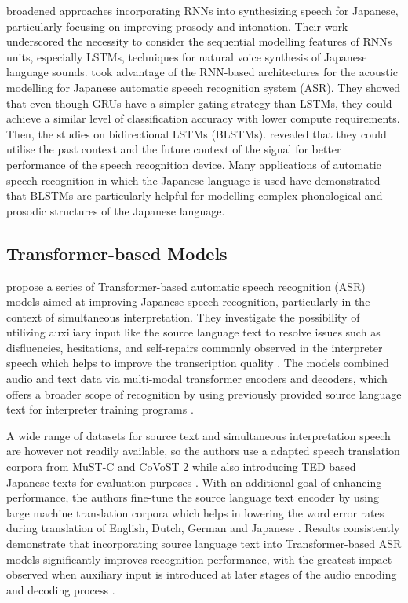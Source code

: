 \textcite{Kubo2014DeepLearning} broadened approaches incorporating RNNs into synthesizing speech for Japanese, particularly focusing on improving prosody and intonation. Their work underscored the necessity to consider the sequential modelling features of RNNs units, especially LSTMs, techniques for natural voice synthesis of Japanese language sounds. \textcite{takeuchi2020real} took advantage of the RNN-based architectures for the acoustic modelling for Japanese automatic speech recognition system (ASR). They showed that even though GRUs have a simpler gating strategy than LSTMs, they could achieve a similar level of classification accuracy with lower compute requirements. Then, the studies on bidirectional LSTMs (BLSTMs). \textcite{imaizumi2022} revealed that they could utilise the past context and the future context of the signal for better performance of the speech recognition device. Many applications of automatic speech recognition in which the Japanese language is used have demonstrated that BLSTMs are particularly helpful for modelling complex phonological and prosodic structures of the Japanese language.


\subsection{Transformer-based Models}  
\textcite{taniguchi2022transformer} propose a series of Transformer-based automatic speech recognition (ASR) models aimed at improving Japanese speech recognition, particularly in the context of simultaneous interpretation. They investigate the possibility of utilizing auxiliary input like the source language text to resolve issues such as disfluencies, hesitations, and self-repairs commonly observed in the interpreter speech which helps to improve the transcription quality \parencite{Futami2020Bidirectional}. The models combined audio and text data via multi-modal transformer encoders and decoders, which offers a broader scope of recognition by using previously provided source language text for interpreter training programs \parencite{taniguchi2022transformer}.

A wide range of datasets for source text and simultaneous interpretation speech are however not readily available, so the authors use a adapted speech translation corpora from MuST-C and CoVoST 2 while also introducing TED based Japanese texts for evaluation purposes \parencite{taniguchi2022transformer}. With an additional goal of enhancing performance, the authors fine-tune the source language text encoder by using large machine translation corpora which helps in lowering the word error rates during translation of English, Dutch, German and Japanese \parencite{Taniguchi2024Pretraining}. Results consistently demonstrate that incorporating source language text into Transformer-based ASR models significantly improves recognition performance, with the greatest impact observed when auxiliary input is introduced at later stages of the audio encoding and decoding process \parencite{Futami2020Bidirectional}.

